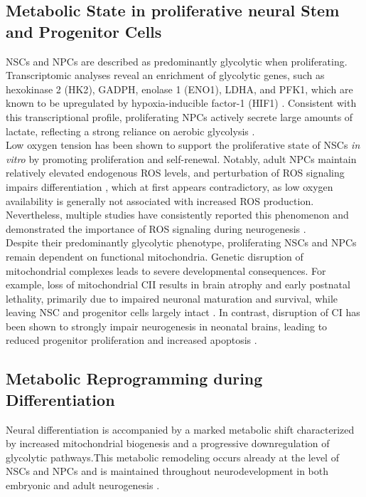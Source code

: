 \subsection{Metabolic State in proliferative neural Stem and Progenitor Cells}
NSCs and NPCs are described as predominantly glycolytic when proliferating. Transcriptomic analyses reveal an enrichment of glycolytic genes, such as hexokinase 2 (\gls{HK2}), GADPH, enolase 1 (\gls{ENO1}), LDHA, and PFK1, which are known to be upregulated by hypoxia-inducible factor-1 (\gls{HIF1}) \citep{LANGEReliefHypoxiaAngiogenesis2016}.
Consistent with this transcriptional profile, proliferating NPCs actively secrete large amounts of lactate, reflecting a strong reliance on aerobic glycolysis \citep{LANGEReliefHypoxiaAngiogenesis2016}.
\\

Low oxygen tension has been shown to support the proliferative state of NSCs \textit{in vitro} by promoting proliferation and self-renewal. Notably, adult NPCs maintain relatively elevated endogenous ROS levels, and perturbation of ROS signaling impairs differentiation \citep{BELLEProliferativeNeuralStem2011},  which at first appears contradictory, as low oxygen availability is generally not associated with increased ROS production. Nevertheless, multiple studies have consistently reported this phenomenon and demonstrated the importance of ROS signaling during neurogenesis \citep{BELLEProliferativeNeuralStem2011,jiUCP2RegulatesEmbryonic2017,chuiOxidativeStressRegulates2020}.
\\

Despite their predominantly  glycolytic phenotype, proliferating NSCs and NPCs remain dependent on functional mitochondria. Genetic disruption of mitochondrial complexes leads to severe developmental consequences. For example, loss of mitochondrial CII results in brain atrophy and early postnatal lethality, primarily due to impaired neuronal maturation and survival, while leaving NSC and progenitor cells largely intact \citep{DIAZ-CASTROResistanceGlialikeCentral2015}.
In contrast, disruption of CI has been shown to strongly impair neurogenesis in neonatal brains, leading to reduced progenitor proliferation and increased apoptosis \citep{CABELLO-RIVERAMitochondrialComplexFunction2019}.
\\

\subsection{Metabolic Reprogramming during Differentiation}
Neural differentiation is accompanied by a marked metabolic shift characterized by increased mitochondrial biogenesis and a progressive downregulation of glycolytic pathways.This metabolic remodeling occurs already at the level of NSCs and NPCs \citep{DONGMetabolicLactateProduction2022} and is maintained throughout neurodevelopment in both embryonic and adult neurogenesis \citep{OBRIENDifferentiationHumanNeural2015,AGOSTINIMetabolicReprogrammingNeuronal2016}.
\\

